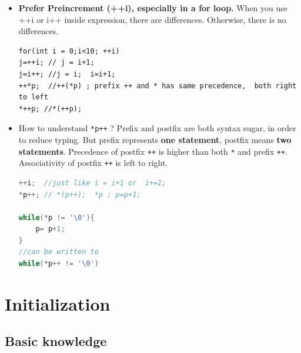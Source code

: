 \documentclass[a4paper,11pt,twoside]{book}
\begin{document}
\begin{itemize}
	\item \textbf{Prefer Preincrement (++i), especially in a for loop.}  When you use ++i or i++ inside expression, there are differences. Otherwise, there is no differences.
	
\begin{lstlisting}[numbers=none]
for(int i = 0;i<10; ++i)
j=++i; // j = i+1;
j=i++; //j = i;  i=i+1;
++*p;  //++(*p) ; prefix ++ and * has same precedence,  both right to left
*++p; //*(++p);
\end{lstlisting}
	
	\item How to understand \texttt{*p++} ? Prefix and postfix are both syntax sugar, in order to reduce typing.   But prefix represents \textbf{one statement}, postfix means \textbf{two statements}. Precedence of postfix \texttt{++} is higher than both \texttt{*} and prefix \texttt{++}. Associativity of postfix \texttt{++} is left to right.
\begin{lstlisting}[frame=single, language=c++]
++i;  //just like i = i+1 or  i+=1;
*p++; // *(p++);  *p ; p=p+1;

while(*p != '\0'){
	p= p+1;
}
//can be written to
while(*p++ != '\0')	
\end{lstlisting}		

	
	
\end{itemize}

\chapter{Initialization}
\section{Basic knowledge}
\end{document}
